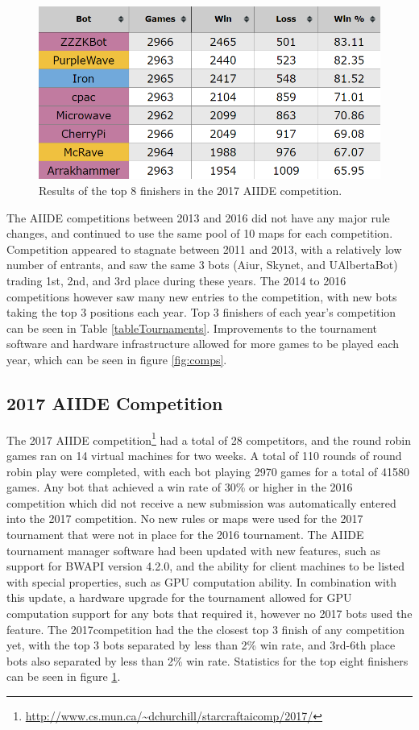 \begin{figure}[t]
  \centering
  \includegraphics[width=1\columnwidth]{fig/aiide2017.png}
  \caption{Results of the top 8 finishers in the 2017 AIIDE competition.}
  \label{figAIIDEresults}
\end{figure}

The AIIDE competitions between 2013 and 2016 did not have any major rule changes, and continued to use the same pool of 10 maps for each competition. Competition appeared to stagnate between 2011 and 2013, with a relatively low number of entrants, and saw the same 3 bots (Aiur, Skynet, and UAlbertaBot) trading 1st, 2nd, and 3rd place during these years. The 2014 to 2016 competitions however saw many new entries to the competition, with new bots taking the top 3 positions each year. Top 3 finishers of each year's competition can be seen in Table \ref{tableTournaments}. Improvements to the tournament software and hardware infrastructure allowed for more games to be played each year, which can be seen in figure \ref{fig:comps}.

\subsection{2017 AIIDE Competition}\label{subsecAIIDEnews}

The 2017 AIIDE competition\footnote{\url{http://www.cs.mun.ca/~dchurchill/starcraftaicomp/2017/}} had a total of 28 competitors, and the round robin games ran on 14 virtual machines for two weeks. A total of 110 rounds of round robin play were completed, with each bot playing 2970 games for a total of 41580 games. Any bot that achieved a win rate of 30\% or higher in the 2016 competition which did not receive a new submission was automatically entered into the 2017 competition. No new rules or maps were used for the 2017 tournament that were not in place for the 2016 tournament. The AIIDE tournament manager software had been updated with new features, such as support for BWAPI version 4.2.0, and the ability for client machines to be listed with special properties, such as GPU computation ability. In combination with this update, a hardware upgrade for the tournament allowed for GPU computation support for any bots that required it, however no 2017 bots used the feature. The 2017competition had the the closest top 3 finish of any competition yet, with the top 3 bots separated by less than 2\% win rate, and 3rd-6th place bots also separated by less than 2\% win rate. Statistics for the top eight finishers can be seen in figure \ref{figAIIDEresults}.

